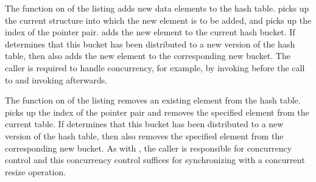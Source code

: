 \QuickQuizEnd

\begin{fcvref}
The  function on  of the listing adds
new data elements to the hash table.
 picks up the current  structure into which the
new element is to be added, and  picks up the index of
the pointer pair.
 adds the new element to the current hash bucket.
If  determines that this bucket has been distributed
to a new version of the hash table, then  also adds the
new element to the corresponding new bucket.
The caller is required to handle concurrency, for example, by invoking
 before the call to  and invoking
 afterwards.
\end{fcvref}

\begin{fcvref}
The  function on
 of the listing removes
an existing element from the hash table.
 picks up the index of the pointer pair
and  removes the specified element from the current table.
If  determines that this bucket has been distributed
to a new version of the hash table, then  also removes
the specified element from the corresponding new bucket.
As with , the caller is responsible for concurrency
control and this concurrency control suffices for synchronizing with
a concurrent resize operation.
\end{fcvref}

